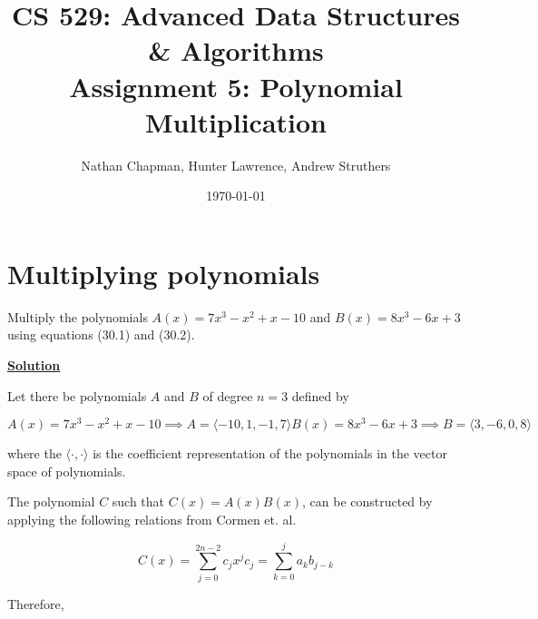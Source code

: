 \documentclass{article}
\title{\vspace*{-0.625in}CS 529: Advanced Data Structures \& Algorithms \\ Assignment 5: Polynomial Multiplication}
\author{Nathan Chapman, Hunter Lawrence, Andrew Struthers}
\date{\today}
\renewcommand{\_}{\ifincsname_\else\legacyunderscore\fi}
\begin{document}
    \maketitle

    \section*{Multiplying polynomials}

        Multiply the polynomials $A(x) = 7 x^3 - x^2 + x - 10$ and $B(x) = 8x^3 - 6x + 3$ using equations (30.1) and (30.2).

        \underline{\textbf{Solution}}

        Let there be polynomials $A$ and $B$ of degree $n = 3$ defined by 

        \begin{subequations}
            \begin{equation}
                A(x) = 7 x^3 - x^2 + x - 10 \implies A = \langle -10, 1, -1, 7 \rangle
            \end{equation}
            \begin{equation}
                B(x) = 8x^3 - 6x + 3 \implies B = \langle 3, -6, 0, 8\rangle
            \end{equation}
        \end{subequations}

        where the $\langle \cdot, \cdot \rangle$ is the coefficient representation of the polynomials in the vector space of polynomials.

        The polynomial $C$ such that $C(x) = A(x)B(x)$, can be constructed by applying the following relations from Cormen et. al. 

        \begin{subequations}
            \begin{equation}
                C(x) = \sum_{j = 0}^{2n - 2} c_j x^j
            \end{equation}
            \begin{equation}
                c_j = \sum_{k = 0}^{j} a_k b_{j - k}
            \end{equation}
        \end{subequations}

        Therefore,
\end{document}
